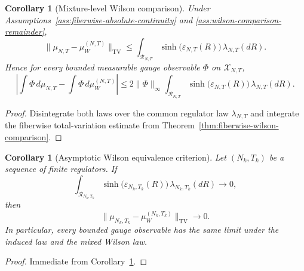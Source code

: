 \documentclass[11pt]{article}
\newtheorem{corollary}[theorem]{Corollary}
\theoremstyle{definition}
\theoremstyle{remark}
\begin{document}
\begin{corollary}[Mixture-level Wilson comparison]
\label{cor:mixture-level-wilson-comparison}
Under Assumptions~\ref{ass:fiberwise-absolute-continuity} and
\ref{ass:wilson-comparison-remainder},
\[
\|\mu_{N,T}-\mu_W^{(N,T)}\|_{\mathrm{TV}}
\le
\int_{\mathscr R_{N,T}}
\sinh\!\bigl(\varepsilon_{N,T}(R)\bigr)\,\lambda_{N,T}(dR).
\]
Hence for every bounded measurable gauge observable \(\Phi\) on
\(\mathscr X_{N,T}\),
\[
\left|
\int\Phi\,d\mu_{N,T}-\int\Phi\,d\mu_W^{(N,T)}
\right|
\le
2\|\Phi\|_\infty
\int_{\mathscr R_{N,T}}
\sinh\!\bigl(\varepsilon_{N,T}(R)\bigr)\,\lambda_{N,T}(dR).
\]
\end{corollary}

\begin{proof}
Disintegrate both laws over the common regulator law \(\lambda_{N,T}\) and
integrate the fiberwise total-variation estimate from
Theorem~\ref{thm:fiberwise-wilson-comparison}.
\end{proof}

\begin{corollary}[Asymptotic Wilson equivalence criterion]
\label{cor:asymptotic-wilson-equivalence}
Let \((N_k,T_k)\) be a sequence of finite regulators. If
\[
\int_{\mathscr R_{N_k,T_k}}
\sinh\!\bigl(\varepsilon_{N_k,T_k}(R)\bigr)\,\lambda_{N_k,T_k}(dR)
\longrightarrow 0,
\]
then
\[
\|\mu_{N_k,T_k}-\mu_W^{(N_k,T_k)}\|_{\mathrm{TV}}\to 0.
\]
In particular, every bounded gauge observable has the same limit under the
induced law and the mixed Wilson law.
\end{corollary}

\begin{proof}
Immediate from Corollary~\ref{cor:mixture-level-wilson-comparison}.
\end{proof}
\end{document}
